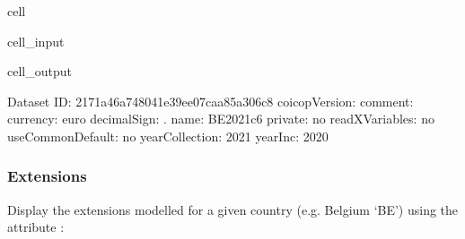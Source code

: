 \documentclass[letterpaper,10pt,english]{sphinxmanual}
\begin{document}
\begin{sphinxuseclass}{cell}
\begin{sphinxuseclass}{cell_input}
\begin{sphinxVerbatim}[commandchars=\\\{\}]
\PYG{p}{[}\PYG{p}{]}\PYG{p}{[}\PYG{p}{]}
\end{sphinxVerbatim}

\end{sphinxuseclass}
\begin{sphinxuseclass}{cell_output}
\begin{sphinxVerbatim}[commandchars=\\\{\}]
\PYGZhy{}\PYGZhy{}\PYGZhy{}\PYGZhy{}\PYGZhy{}\PYGZhy{}\PYGZhy{}\PYGZhy{}\PYGZhy{}\PYGZhy{}\PYGZhy{}\PYGZhy{}\PYGZhy{}\PYGZhy{}\PYGZhy{}\PYGZhy{}\PYGZhy{}\PYGZhy{}\PYGZhy{}\PYGZhy{}\PYGZhy{}\PYGZhy{}\PYGZhy{}\PYGZhy{}\PYGZhy{}\PYGZhy{}\PYGZhy{}\PYGZhy{}\PYGZhy{}\PYGZhy{}
Dataset
\PYGZhy{}\PYGZhy{}\PYGZhy{}\PYGZhy{}\PYGZhy{}\PYGZhy{}\PYGZhy{}\PYGZhy{}\PYGZhy{}\PYGZhy{}\PYGZhy{}\PYGZhy{}\PYGZhy{}\PYGZhy{}\PYGZhy{}\PYGZhy{}\PYGZhy{}\PYGZhy{}\PYGZhy{}\PYGZhy{}\PYGZhy{}\PYGZhy{}\PYGZhy{}\PYGZhy{}\PYGZhy{}\PYGZhy{}\PYGZhy{}\PYGZhy{}\PYGZhy{}\PYGZhy{}
	 ID: \PYGZsq{}2171a46a\PYGZhy{}7480\PYGZhy{}41e3\PYGZhy{}9ee0\PYGZhy{}7caa85a306c8\PYGZsq{}
	 coicopVersion: \PYGZsq{}\PYGZsq{}
	 comment: \PYGZsq{}\PYGZsq{}
	 currency: \PYGZsq{}euro\PYGZsq{}
	 decimalSign: \PYGZsq{}.\PYGZsq{}
	 name: \PYGZsq{}BE\PYGZus{}2021\PYGZus{}c6\PYGZsq{}
	 private: \PYGZsq{}no\PYGZsq{}
	 readXVariables: \PYGZsq{}no\PYGZsq{}
	 useCommonDefault: \PYGZsq{}no\PYGZsq{}
	 yearCollection: \PYGZsq{}2021\PYGZsq{}
	 yearInc: \PYGZsq{}2020\PYGZsq{}
\end{sphinxVerbatim}

\end{sphinxuseclass}
\end{sphinxuseclass}

\subsubsection{Extensions}
\label{\detokenize{notebooks/userguide:extensions}}
\sphinxAtStartPar
Display the extensions modelled for a given country (e.g. Belgium ‘BE’) using the attribute :
\end{document}
